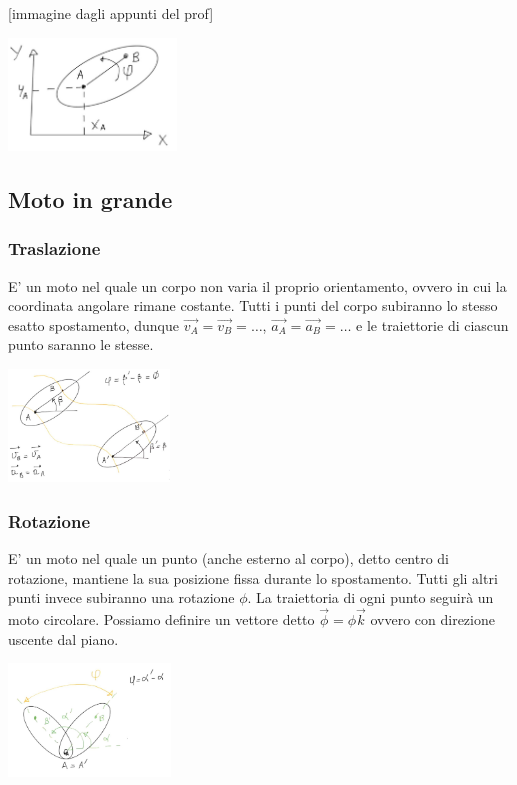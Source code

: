 [immagine dagli appunti del prof]
\begin{center}
    \includegraphics[height=3cm]{../lezione2/img2.JPG}
\end{center}
\subsection{Moto in grande}
\subsubsection{Traslazione} 
E' un moto nel quale un corpo non varia il proprio orientamento, ovvero in cui la coordinata angolare rimane costante. Tutti i punti del corpo subiranno lo stesso esatto spostamento, dunque $\vec{v_A} = \vec{v_B} = \dots$, $\vec{a_A} = \vec{a_B} = \dots$ e le traiettorie di ciascun punto saranno le stesse.
\begin{center}
    \includegraphics[height=3cm]{../lezione2/img3.JPG}
\end{center}
\subsubsection{Rotazione} 
E' un moto nel quale un punto (anche esterno al corpo), detto centro di rotazione, mantiene la sua posizione fissa durante lo spostamento. Tutti gli altri punti invece subiranno una rotazione $\phi$. La traiettoria di ogni punto seguirà un moto circolare. Possiamo definire un vettore detto $\vec{\phi} = \phi \vec{k}$ ovvero con direzione uscente dal piano.
\begin{center}
    \includegraphics[height=3cm]{../lezione2/img4.JPG}
\end{center}
